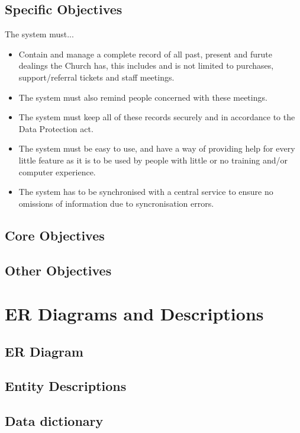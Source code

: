 \subsection{Specific Objectives}
	The system must...
	\begin{itemize}
		\item Contain and manage a complete record of all past, present and furute dealings the Church has, this includes and is not limited to purchases, support/referral tickets and staff meetings.
		\item The system must also remind people concerned with these meetings.
		\item The system must keep all of these records securely and in accordance to the Data Protection act.
		\item The system must be easy to use, and have a way of providing help for every little feature as it is to be used by people with little or no training and/or computer experience.
		\item The system has to be synchronised with a central service to ensure no omissions of information due to syncronisation errors.
	\end{itemize}

\subsection{Core Objectives}

\subsection{Other Objectives}

\section{ER Diagrams and Descriptions}

\subsection{ER Diagram}

\subsection{Entity Descriptions}

\subsection{Data dictionary}

